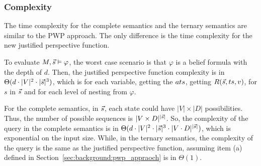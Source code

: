\subsubsection{Complexity}
The time complexity for the complete semantics and the ternary semantics are similar to the PWP approach.
The only difference is the time complexity for the new justified perspective function.

To evaluate $M, \Vec{s} \vDash \varphi$, the worst case scenario is that $\varphi$ is a belief formula with the depth of $d$.
Then, the justified perspective function complexity is in $\Theta(d\cdot|V|^2\cdot|\Vec{s}|^3)$, which is for each variable, getting the $ats$, getting $R(\Vec{s},ts,v)$, for $s$ in $\Vec{s}$ and for each level of nesting from $\varphi$.

For the complete semantics, in $\Vec{s}$, each state could have $|V| \times |D|$ possibilities.
Thus, the number of possible sequences is $|V \times D|^{|\Vec{s}|}$.
So, the complexity of the query in the complete semantics is in $\Theta(d\cdot|V|^2\cdot|\Vec{s}|^3 \cdot |V \cdot D|^{|\Vec{s}|})$, which is exponential on the input size.
While, in the ternary semantics, the complexity of the query is the same as the justified perspective function, assuming item (a) defined in Section~\ref{sec:background:pwp_appraoch} is in $\Theta(1)$.



